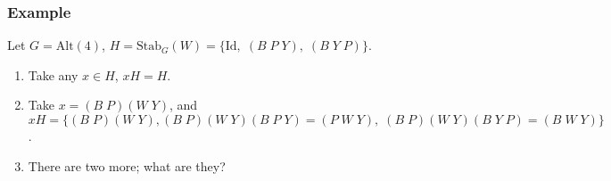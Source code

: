 \documentclass[11pt]{article}
\newcommand{\0}{\emptyset}
\begin{document}
\subsubsection*{Example}
\label{sec:org1170298}
Let \(G=\text{Alt}(4)\), \(H=\text{Stab}_{G}(W)=\{\text{Id},\;(B\;P\;Y),\;(B\;Y\;P)\}\).\\[0pt]
\begin{enumerate}
\item Take any \(x\in H\), \(xH=H\).\\[0pt]
\item Take \(x=(B\;P)(W\;Y)\), and \(xH=\{(B\;P)(W\;Y),(B\;P)(W\;Y)(B\;P\;Y)=(P\;W\;Y),\;(B\;P)(W\;Y)(B\;Y\;P)=(B\;W\;Y)\}\).\\[0pt]
\item There are two more; what are they?\\[0pt]
\end{enumerate}
\end{document}
